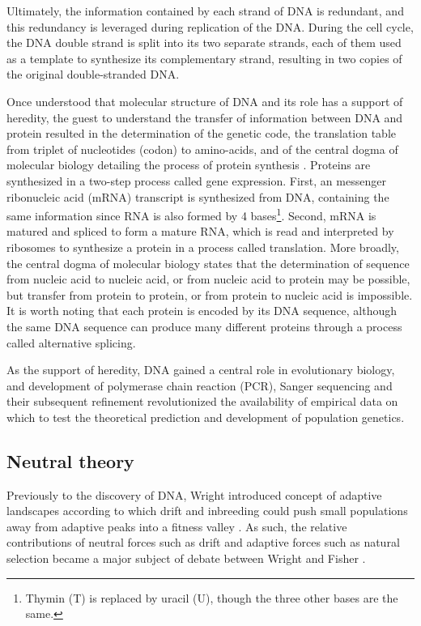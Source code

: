 Ultimately, the information contained by each strand of \acrshort{DNA} is redundant, and this redundancy is leveraged during replication of the \acrshort{DNA}.
During the cell cycle, the \acrshort{DNA} double strand is split into its two separate strands, each of them used as a template to synthesize its complementary strand, resulting in two copies of the original double-stranded \acrshort{DNA}.

Once understood that molecular structure of \acrshort{DNA} and its role has a support of heredity, the guest to understand the transfer of information between \acrshort{DNA} and protein \cite{Crick1958} resulted in the determination of the genetic code, the translation table from triplet of nucleotides (\gls{codon}) to amino-acids, and of the central dogma of molecular biology detailing the process of protein synthesis \cite{Crick1970}.
Proteins are synthesized in a two-step process called gene expression.
First, an messenger ribonucleic acid (mRNA) transcript is synthesized from \acrshort{DNA}, containing the same information since \acrshort{RNA} is also formed by 4 bases\footnote{Thymin (T) is replaced by uracil (U), though the three other bases are the same.}. 
Second, mRNA is matured and spliced to form a mature \acrshort{RNA}, which is read and interpreted by ribosomes to synthesize a protein in a process called translation. 
More broadly, the central dogma of molecular biology states that the determination of sequence from nucleic acid to nucleic acid, or from nucleic acid to protein may be possible, but transfer from protein to protein, or from protein to nucleic acid is impossible.
It is worth noting that each protein is encoded by its \acrshort{DNA} sequence, although the same \acrshort{DNA} sequence can produce many different proteins through a process called alternative splicing.

As the support of heredity, \acrshort{DNA} gained a central role in evolutionary biology, and development of polymerase chain reaction (PCR), Sanger sequencing and their subsequent refinement revolutionized the availability of empirical data on which to test the theoretical prediction and development of population genetics.

\subsection{Neutral theory}

Previously to the discovery of \acrshort{DNA}, Wright introduced concept of adaptive landscapes according to which \gls{drift} and inbreeding could push small populations away from adaptive peaks into a fitness valley \citep{wright1932roles}. 
As such, the relative contributions of \gls{neutral} forces such as \gls{drift} and adaptive forces such as natural selection became a major subject of debate between Wright and Fisher \citep{plutynski2007drift}.

